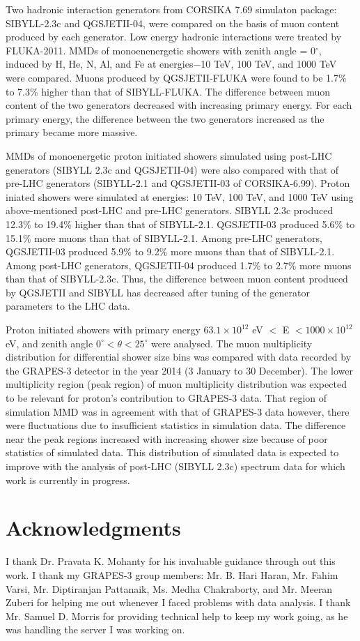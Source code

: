 \documentclass[12pt]{article}
\begin{document}
Two hadronic interaction generators from CORSIKA 7.69 simulaton package: SIBYLL-2.3c and QGSJETII-04, were compared on the basis of muon content produced by each generator. Low energy hadronic interactions were treated by FLUKA-2011. MMDs of monoenenergetic showers with zenith angle = 0$^\circ$, induced by H, He, N, Al, and Fe at energies$-$10 TeV, 100 TeV, and 1000 TeV were compared. Muons produced by QGSJETII-FLUKA were found to be 1.7\% to 7.3\% higher than  that of SIBYLL-FLUKA. The difference between muon content of the two generators decreased with increasing primary energy. For each primary energy, the difference between the two generators increased as the primary became more massive.

MMDs of monoenergetic proton initiated showers simulated using post-LHC generators (SIBYLL 2.3c and QGSJETII-04) were  also compared with that of pre-LHC generators (SIBYLL-2.1 and QGSJETII-03 of CORSIKA-6.99). Proton iniated showers were simulated at energies: 10 TeV, 100 TeV, and 1000 TeV using above-mentioned post-LHC and pre-LHC generators. SIBYLL 2.3c produced 12.3\% to 19.4\% higher than that of SIBYLL-2.1. QGSJETII-03 produced 5.6\% to 15.1\% more muons than that of SIBYLL-2.1. Among pre-LHC generators, QGSJETII-03 produced 5.9\% to 9.2\% more muons than that of SIBYLL-2.1. Among post-LHC generators, QGSJETII-04 produced 1.7\% to 2.7\% more muons than that of SIBYLL-2.3c. Thus, the difference between muon content produced by QGSJETII and SIBYLL has decreased after tuning of the generator parameters to the LHC data.

Proton initiated showers with primary energy $63.1\times10^{12}$ eV $ < $ E $<1000\times10^{12}$ eV, and zenith angle $0^\circ<\theta<25^\circ$ were analysed. The muon multiplicity distribution for differential shower size bins was compared with data recorded by the GRAPES-3 detector in the year 2014 (3 January to 30 December). The lower multiplicity region (peak region) of muon multiplicity distribution was expected to be relevant for proton's contribution to GRAPES-3 data. That region of simulation MMD was in agreement with that of GRAPES-3 data however, there were fluctuations due to insufficient statistics in simulation data. The difference near the peak regions increased with increasing shower size because of poor statistics of simulated data. This distribution of simulated data is expected to improve with the analysis of post-LHC (SIBYLL 2.3c) spectrum data for which work is currently in progress.

\section{Acknowledgments}
I thank Dr. Pravata K. Mohanty for his invaluable guidance through out this work. I thank my GRAPES-3 group members: Mr. B. Hari Haran, Mr. Fahim Varsi, Mr. Diptiranjan Pattanaik, Ms. Medha Chakraborty, and Mr. Meeran Zuberi for helping me out whenever I faced problems with data analysis. I thank Mr. Samuel D. Morris for providing technical help to keep my work going, as he was handling the server I was working on.  
\end{document}
